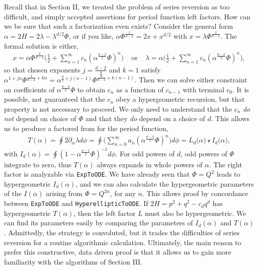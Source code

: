 \documentclass[nofootinbib,preprint]{revtex4-1}
\begin{document}
Recall that in Section II, we treated the problem of series reversion as too difficult, 
and simply accepted assertions for period function left factors. How can we be sure 
that such a factorization even exists? Consider the general form 
$\alpha=2H=2\lambda - \lambda^{d/2} \Phi$, or if you like, 
$\alpha \Phi^{\frac{2}{d-2}} = 2x+x^{d/2}$ with $x=\lambda \Phi^{\frac{2}{d-2}}$.
The formal solution is either, 
\begin{eqnarray}
x=\alpha \Phi^{\frac{2}{d-2}}\bigg(\frac{1}{2}
+\sum_{n=1}^{\infty}c_n(\alpha^{\frac{d-2}{2}} \Phi )^{n} \bigg) 
\;\;\;\; \text{or} \;\;\;\;
\lambda = \alpha \bigg(\frac{1}{2} +\sum_{n=1}^{\infty}c_n(\alpha^{\frac{d-2}{2}} \Phi )^{n} \bigg), \nonumber
\end{eqnarray}
so that chosen exponents $j=\frac{d-2}{2}$ and $k=1$ satisfy 
$\alpha^{1+j n}\Phi^{\frac{2}{d-2}+kn}=\alpha^{\frac{d}{2}+j(n-1)}\Phi^{\frac{d}{d-2}+k(n-1)}$. 
Then we can solve either constraint on coefficients of $\alpha^{\frac{d-2}{2}}\Phi$ to obtain 
$c_n$ as a function of $c_{n-1}$ with terminal $c_0$. It is possible, not guaranteed that the $c_n$
obey a hypergeometric recursion, but that property is not necessary to proceed. We only need to 
understand that the $c_n$ \textit{do not} depend on choice of $\Phi$ and that they \textit{do} 
depend on a choice of $d$. This allows us to produce a factored from for the period function, 
\begin{eqnarray}
T(\alpha) =\oint 2\partial_{\alpha}\lambda d\phi = \oint\bigg(\sum_{n=0}^{\infty} a_n(\alpha^{\frac{d-2}{2}} \Phi)^{n} \bigg)d\phi
=L_d\Big(\alpha\Big) \star I_d\Big(\alpha\Big), \nonumber  
\end{eqnarray} 
with $I_d(\alpha) = \oint (1-\alpha^{\frac{d-2}{2}} \Phi)^{-1}d\phi$. For odd powers of
$d$, odd powers of $\Phi$ integrate to zero, thus $T(\alpha)$ always expands in whole powers of $\alpha$.
The right factor is analyzable via \texttt{ExpToODE}. We have already seen that $\Phi=Q^{2}$ leads 
to hypergeometric $I_d(\alpha)$, and we can also calculate the hypergeometric parameters of the $I(\alpha)$ arising
from $\Phi=Q^{2n}$, for any $n$. This allows proof by concordance 
between \texttt{ExpToODE} and \texttt{HyperellipticToODE}. If $2H=p^2+q^2-c_d q^d$ has 
hypergeometric $T(\alpha)$, then the left factor $L$ must also be hypergeometric. We can find its 
parameters easily by comparing the parameters of $I_d(\alpha)$ and $T(\alpha)$. Admittedly, the 
strategy is convoluted, but it trades the difficulties of series reversion for a routine 
algorithmic calculation. Ultimately, the main reason to prefer this constructive, data driven 
proof is that it allows us to gain more familiarity with the algorithms of Section III. 
\end{document}
